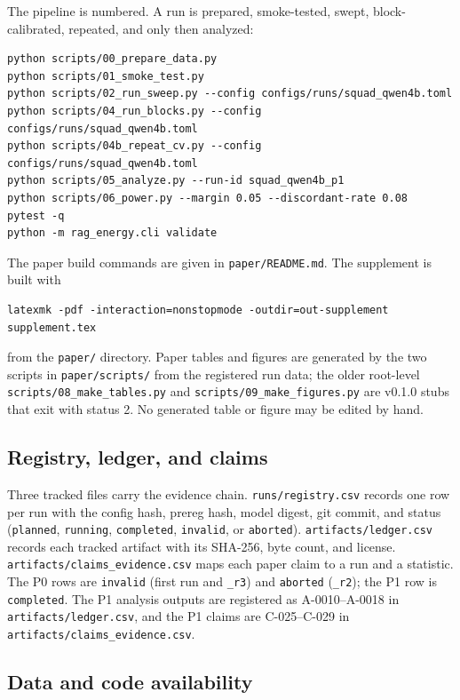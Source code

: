 The pipeline is numbered. A run is prepared, smoke-tested, swept, block-calibrated, repeated,
and only then analyzed:
\begin{verbatim}
python scripts/00_prepare_data.py
python scripts/01_smoke_test.py
python scripts/02_run_sweep.py --config configs/runs/squad_qwen4b.toml
python scripts/04_run_blocks.py --config configs/runs/squad_qwen4b.toml
python scripts/04b_repeat_cv.py --config configs/runs/squad_qwen4b.toml
python scripts/05_analyze.py --run-id squad_qwen4b_p1
python scripts/06_power.py --margin 0.05 --discordant-rate 0.08
pytest -q
python -m rag_energy.cli validate
\end{verbatim}
The paper build commands are given in \texttt{paper/README.md}. The supplement is built with
\begin{verbatim}
latexmk -pdf -interaction=nonstopmode -outdir=out-supplement supplement.tex
\end{verbatim}
from the \texttt{paper/} directory. Paper tables and figures are generated by the two scripts in
\texttt{paper/scripts/} from the registered run data; the older root-level
\texttt{scripts/08\_make\_tables.py} and \texttt{scripts/09\_make\_figures.py} are v0.1.0 stubs
that exit with status 2. No generated table or figure may be edited by hand.

\subsection{Registry, ledger, and claims}

Three tracked files carry the evidence chain. \texttt{runs/registry.csv} records one row per
run with the config hash, prereg hash, model digest, git commit, and status
(\texttt{planned}, \texttt{running}, \texttt{completed}, \texttt{invalid}, or \texttt{aborted}).
\texttt{artifacts/ledger.csv} records each tracked artifact with its SHA-256, byte count, and
license. \texttt{artifacts/claims\_evidence.csv} maps each paper claim to a run and a statistic.
The P0 rows are \texttt{invalid} (first run and \texttt{\_r3}) and \texttt{aborted}
(\texttt{\_r2}); the P1 row is \texttt{completed}. The P1 analysis outputs are registered as
A-0010--A-0018 in \texttt{artifacts/ledger.csv}, and the P1 claims are C-025--C-029 in
\texttt{artifacts/claims\_evidence.csv}.

\subsection{Data and code availability}

